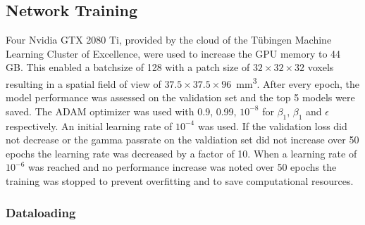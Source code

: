 \subsection{Network Training}

Four Nvidia GTX 2080 Ti, provided by the cloud of the Tübingen Machine Learning Cluster of Excellence, were used to increase the \acs{GPU} memory to 44 GB.
This enabled a batchsize of 128 with a patch size of $32 \times 32 \times 32$ voxels resulting in a spatial field of view of $37.5 \times 37.5 \times 96$~mm\textsuperscript{3}. 
After every epoch, the model performance was assessed on the validation set and the top 5 models were saved. 
The ADAM optimizer was used with 0.9, 0.99, $10^{-8}$ for $\beta_1$, $\beta_1$ and $\epsilon$ respectively. 
An initial learning rate of $10^{-4}$ was used. If the validation loss did not decrease or the gamma passrate on the valdiation set did not increase over 50 epochs the learning rate was decreased by a factor of 10. 
When a learning rate of $10^{-6}$ was reached and no performance increase was noted over 50 epochs the training was stopped to prevent overfitting and to save computational resources.
 

\subsubsection{Dataloading}

